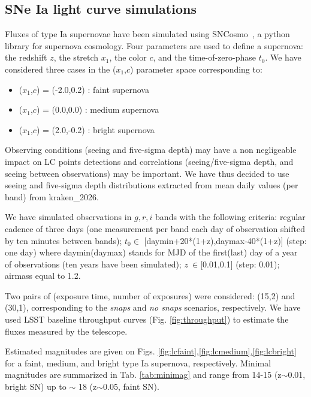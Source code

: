 \documentclass[\docopts]{\docclass}
\newcommand{\sne}{{SNe Ia }}
\newcommand{\sncosmo}{{\sc SNCosmo}}
\newcommand{\redshift}{{$z$}}
\newcommand{\snstretch}{{$x_{1}$}}
\newcommand{\sncolor}{{$c$}}
\newcommand{\daymax}{{$t_{0}$}}
\begin{document}
\subsection{\sne light curve simulations}
Fluxes of type Ia supernovae have been simulated using \sncosmo~\cite{2016ascl.soft11017B}, a python library for supernova cosmology. Four parameters are used to define a supernova: the redshift \redshift, the stretch \snstretch, the color \sncolor, and the time-of-zero-phase \daymax. We have considered three cases in the (\snstretch,\sncolor) parameter space corresponding to:
\begin{itemize}
\item (\snstretch,\sncolor) = (-2.0,0.2) : faint supernova
\item (\snstretch,\sncolor) = (0.0,0.0) : medium supernova
 \item (\snstretch,\sncolor) = (2.0,-0.2) : bright supernova
\end{itemize}
Observing conditions (seeing and five-sigma depth) may have a non negligeable impact on LC points detections and correlations (seeing/five-sigma depth, and  seeing between observations) may be important. We have thus decided to use seeing and five-sigma depth distributions extracted from mean daily values (per band) from kraken\_2026.\par
We have simulated observations in $g,r,i$ bands with the following criteria:  regular cadence of three days (one measurement per band each day of observation shifted by ten minutes between bands); \daymax $\in$ [daymin+20*(1+z),daymax-40*(1+z)] (step: one day) where daymin(daymax)  stands for MJD of the first(last)  day of a year of observations (ten years have been simulated); $z~\in$[0.01,0.1] (step: 0.01); airmass equal to 1.2. \par
Two pairs of (exposure time, number of exposures) were considered: (15,2) and (30,1), corresponding to the {\it snaps} and {\it no snaps} scenarios, respectively. We have used LSST baseline throughput curves (Fig. \ref{fig:throughput}) to estimate the fluxes measured by the telescope.


Estimated magnitudes are given on Figs. \ref{fig:lcfaint},\ref{fig:lcmedium},\ref{fig:lcbright} for a faint, medium, and bright type Ia supernova, respectively. Minimal magnitudes are summarized in Tab. \ref{tab:minimag} and range from 14-15 (z$\sim$0.01, bright SN) up to $\sim$ 18 (z$\sim$0.05, faint SN). 
\end{document}

